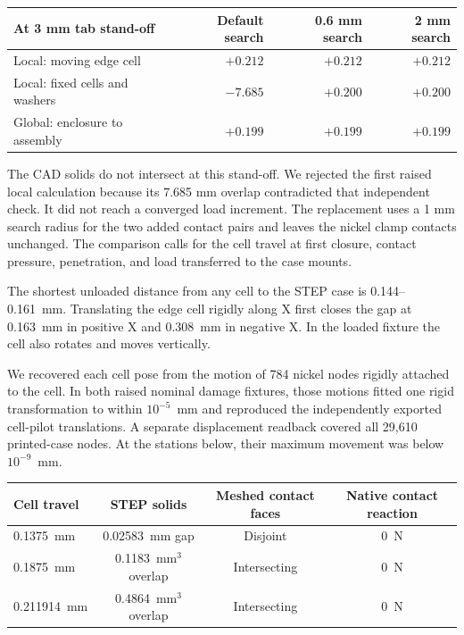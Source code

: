 \begin{center}\small
\begin{tabular}{p{.39\linewidth}rrr}\toprule
At 3 mm tab stand-off & Default search & 0.6 mm search & 2 mm search\\\midrule
Local: moving edge cell & $+0.212$ & $+0.212$ & $+0.212$\\
Local: fixed cells and washers & $-7.685$ & $+0.200$ & $+0.200$\\
Global: enclosure to assembly & $+0.199$ & $+0.199$ & $+0.199$\\\bottomrule
\end{tabular}
\end{center}

The CAD solids do not intersect at this stand-off. We rejected the first raised local calculation because its 7.685 mm overlap contradicted that independent check. It did not reach a converged load increment. The replacement uses a 1 mm search radius for the two added contact pairs and leaves the nickel clamp contacts unchanged. The comparison calls for the cell travel at first closure, contact pressure, penetration, and load transferred to the case mounts.

The shortest unloaded distance from any cell to the STEP case is 0.144--0.161~mm. Translating the edge cell rigidly along X first closes the gap at 0.163~mm in positive X and 0.308~mm in negative X. In the loaded fixture the cell also rotates and moves vertically.

We recovered each cell pose from the motion of 784 nickel nodes rigidly attached to the cell. In both raised nominal damage fixtures, those motions fitted one rigid transformation to within $10^{-5}$~mm and reproduced the independently exported cell-pilot translations. A separate displacement readback covered all 29,610 printed-case nodes. At the stations below, their maximum movement was below $10^{-9}$~mm.

\begin{center}\small\begin{tabular}{lccc}\toprule
Cell travel & STEP solids & Meshed contact faces & Native contact reaction\\\midrule
0.1375~mm & 0.02583~mm gap & Disjoint & 0~N\\
0.1875~mm & 0.1183~mm$^3$ overlap & Intersecting & 0~N\\
0.211914~mm & 0.4864~mm$^3$ overlap & Intersecting & 0~N\\\bottomrule
\end{tabular}
\end{center}

